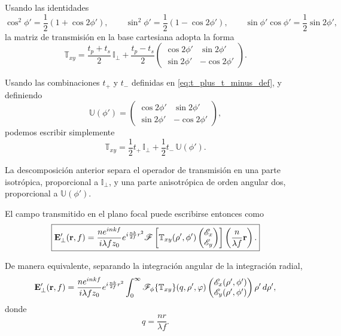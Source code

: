 Usando las identidades
\begin{equation}
\cos^2\phi'
=
\frac{1}{2}
\left(
1+\cos2\phi'
\right),
\qquad
\sin^2\phi'
=
\frac{1}{2}
\left(
1-\cos2\phi'
\right),
\qquad
\sin\phi'\cos\phi'
=
\frac{1}{2}\sin2\phi',
\end{equation}
la matriz de transmisión en la base cartesiana adopta la forma
\begin{equation}
\boxed{
  \mathbb T_{xy}
  =
  \frac{t_p+t_s}{2}\,\mathbb I_\perp
  +
  \frac{t_p-t_s}{2}
  \begin{pmatrix}
    \cos 2\phi' & \sin 2\phi' \\
    \sin 2\phi' & -\cos 2\phi'
  \end{pmatrix}.
}
\label{eq:M_in_cartesian_basis}
\end{equation}

Usando las combinaciones $t_+$ y $t_-$ definidas en \eqref{eq:t_plus_t_minus_def}, y definiendo
\begin{equation}
  \mathbb U(\phi')
  =
  \begin{pmatrix}
    \cos 2\phi' & \sin 2\phi' \\
    \sin 2\phi' & -\cos 2\phi'
  \end{pmatrix},
\label{eq:U_phi_cartesian_def}
\end{equation}
podemos escribir simplemente
\begin{equation}
  \mathbb T_{xy}
  =
  \frac{1}{2}t_+\,\mathbb I_\perp
  +
  \frac{1}{2}t_-\,\mathbb U(\phi').
\label{eq:M_cartesian_tplus_tminus}
\end{equation}

La descomposición anterior separa el operador de transmisión en una parte
isotrópica, proporcional a $\mathbb I_\perp$, y una parte anisotrópica de
orden angular dos, proporcional a $\mathbb U(\phi')$.

El campo transmitido en el plano focal puede escribirse entonces como
\begin{equation}
\boxed{
\vb E'_\perp(\vb r,f)
=
\frac{n e^{inkf}}{i\lambda f z_0}
e^{i\frac{nk}{2f}r^2}
\mathscr F
\left[
\mathbb T_{xy}(\rho',\phi')
\begin{pmatrix}
\mathscr E_x\\
\mathscr E_y
\end{pmatrix}
\right]
\left(
\frac{n}{\lambda f}\vb r
\right).
}
\label{eq:E_prime_cartesian_general_Fourier}
\end{equation}

De manera equivalente, separando la integración angular de la integración radial,
\begin{equation}
\vb E'_\perp(\vb r,f)
=
\frac{n e^{inkf}}{i\lambda f z_0}
e^{i\frac{nk}{2f}r^2}
\int_0^\infty
\mathscr F_\phi\{\mathbb T_{xy}\}
(q,\rho',\varphi)
\begin{pmatrix}
\mathscr E_x(\rho',\phi')\\
\mathscr E_y(\rho',\phi')
\end{pmatrix}
\rho'\,d\rho',
\label{eq:E_prime_cartesian_general_radial_integral}
\end{equation}
donde
\begin{equation}
  q
  =
  \frac{n r}{\lambda f}.
\label{eq:q_cartesian_def}
\end{equation}

